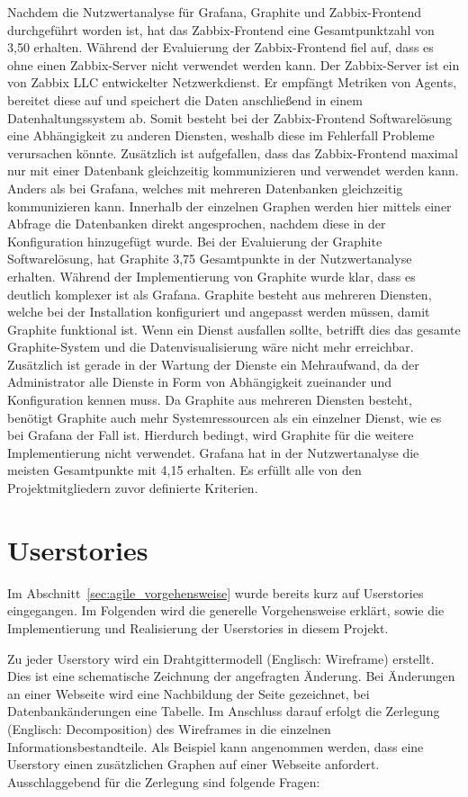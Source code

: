 Nachdem die Nutzwertanalyse für Grafana, Graphite und Zabbix\hyp{}Frontend
durchgeführt worden ist, hat das Zabbix\hyp{}Frontend eine Gesamtpunktzahl von
3,50 erhalten. Während der Evaluierung der Zabbix\hyp{}Frontend fiel auf, dass
es ohne einen Zabbix\hyp{}Server nicht verwendet werden kann. Der
Zabbix\hyp{}Server ist ein von Zabbix LLC entwickelter Netzwerkdienst. Er
empfängt Metriken von \gls{Agents}, bereitet diese auf und speichert die
Daten anschließend in einem Datenhaltungssystem ab. Somit besteht bei der
Zabbix\hyp{}Frontend Softwarelösung eine Abhängigkeit zu anderen Diensten,
weshalb diese im Fehlerfall Probleme verursachen könnte. Zusätzlich ist
aufgefallen, dass das Zabbix\hyp{}Frontend maximal nur mit einer Datenbank
gleichzeitig kommunizieren und verwendet werden kann. Anders als bei Grafana,
welches mit mehreren Datenbanken gleichzeitig kommunizieren kann. Innerhalb
der einzelnen Graphen werden hier mittels einer Abfrage die Datenbanken direkt
angesprochen, nachdem diese in der Konfiguration hinzugefügt wurde. Bei der
Evaluierung der Graphite Softwarelösung, hat Graphite 3,75 Gesamtpunkte in der
Nutzwertanalyse erhalten. Während der Implementierung von Graphite wurde klar,
dass es deutlich komplexer ist als Grafana. Graphite besteht aus mehreren
Diensten, welche bei der Installation konfiguriert und angepasst werden müssen,
damit Graphite funktional ist. Wenn ein Dienst ausfallen sollte, betrifft dies
das gesamte Graphite\hyp{}System und die Datenvisualisierung wäre nicht mehr
erreichbar. Zusätzlich ist gerade in der Wartung der Dienste ein Mehraufwand,
da der Administrator alle Dienste in Form von Abhängigkeit zueinander und
Konfiguration kennen muss. Da Graphite aus mehreren Diensten besteht, benötigt
Graphite auch mehr Systemressourcen als ein einzelner Dienst, wie es bei
Grafana der Fall ist. Hierdurch bedingt, wird Graphite für die weitere
Implementierung nicht verwendet. Grafana hat in der Nutzwertanalyse die meisten
Gesamtpunkte mit 4,15 erhalten. Es erfüllt alle von den Projektmitgliedern
zuvor definierte Kriterien.
\mr%

\chapter{Userstories}
Im Abschnitt~\ref{sec:agile_vorgehensweise} wurde bereits kurz auf Userstories
eingegangen. Im Folgenden wird die generelle Vorgehensweise erklärt, sowie die
Implementierung und Realisierung der Userstories in diesem Projekt.

Zu jeder Userstory wird ein Drahtgittermodell (Englisch: Wireframe) erstellt.
Dies ist eine schematische Zeichnung der angefragten Änderung. Bei Änderungen
an einer Webseite wird eine Nachbildung der Seite gezeichnet, bei
Datenbankänderungen eine Tabelle. Im Anschluss darauf erfolgt die Zerlegung
(Englisch: Decomposition) des Wireframes in die einzelnen
Informationsbestandteile. Als Beispiel kann angenommen werden, dass eine
Userstory einen zusätzlichen Graphen auf einer Webseite anfordert.
Ausschlaggebend für die Zerlegung sind folgende Fragen:

